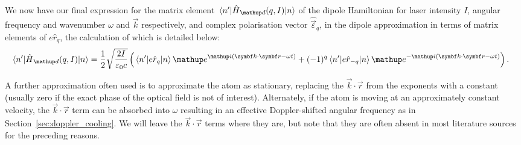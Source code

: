 We now have our final expression for the matrix element $\matrixel{n^\prime}{\hat H_\up{d}(q,I)}{n}$ of the dipole Hamiltonian for laser intensity $I$, angular frequency and wavenumber $\omega$ and $\vec k$ respectively, and complex polarisation vector $\hat{\vec\varepsilon}_q$, in the dipole approximation in terms of matrix elements of $e\hat r_q$, the calculation of which is detailed below:
\begin{align}\label{eq:diple_matrixel_withminus}
\matrixel{n^\prime}{\hat H_\up{d}(q,I)}{n} &= 
\frac12\sqrt{\frac{2I}{\varepsilon_0 c}}\left(
\matrixel{n^\prime}
  {e\hat r_q}
  {n}\ee^{\ii(\vec k \cdot \vec r - \omega t)}
+(-1)^q
\matrixel{n^\prime}
  {e\hat r_{-q}}
  {n} \ee^{-\ii(\vec k \cdot \vec r - \omega t)}\right).
\end{align}

A further approximation often used is to approximate the atom as stationary, replacing the $\vec k\cdot\vec r$ from the exponents with a constant (usually zero if the exact phase of the optical field is not of interest). Alternately, if the atom is moving at an approximately constant velocity, the $\vec k \cdot\vec r$ term can be absorbed into $\omega$ resulting in an effective Doppler-shifted angular frequency as in Section~\ref{sec:doppler_cooling}. We will leave the $\vec k\cdot\vec r$ terms where they are, but note that they are often absent in most literature sources for the preceding reasons.

